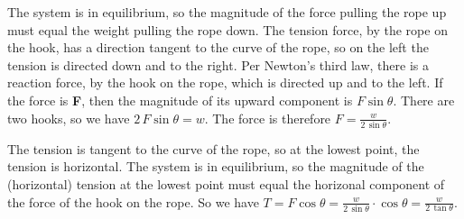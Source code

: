 \documentclass{amsart}
\begin{document}
The system is in equilibrium, so the magnitude of the force pulling the rope up must
equal the weight pulling the rope down.
The tension force, by the rope on the hook, has a direction tangent to the curve of the rope, 
so on the left the tension is directed down and to the right. 
Per Newton's third law, there is a reaction force, by the hook on the rope, 
which is directed up and to the left.
If the force is \textbf{F}, then the magnitude of its upward component is $F \sin \theta$.
There are two hooks, so we have $2\,F \sin \theta = w$.
The force is therefore $F = \frac{w}{2\,\sin \theta}$.

The tension is tangent to the curve of the rope, so at the lowest point, the tension is horizontal.
The system is in equilibrium, so the magnitude of the (horizontal) tension at the lowest point 
must equal the horizonal component of the force of the hook on the rope.
So we have $T = F \cos \theta = \frac{w}{2\,\sin \theta} \cdot \cos \theta = \frac{w}{2\,\tan \theta}$.
\end{document}
